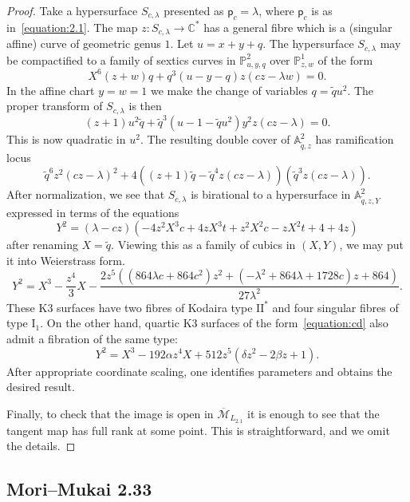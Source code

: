\documentclass[10pt]{amsart}
\numberwithin{equation}{section}
\theoremstyle{plain}
\theoremstyle{definition}
\theoremstyle{remark}
\begin{document}
\begin{proof}
  Take a hypersurface \(S_{c,\lambda}\) presented as \(\mathsf{p}_c = \lambda\), where \(\mathsf{p}_c\) is as in~\eqref{equation:2.1}. The map \(z \colon S_{c,\lambda}\rightarrow \mathbb{C}^*\) has a general fibre which is a (singular affine) curve of geometric genus \(1\). Let \(u= x+y+q\). The hypersurface \(S_{c,\lambda}\) may be compactified to a family of sextics curves in \(\mathbb{P}^2_{u,y,q}\) over \(\mathbb{P}^1_{z,w}\) of the form
  \[
    X^6(z+ w)q + q^3(u-y-q)z(cz-\lambda w) = 0.
  \]
  In the affine chart \(y=w=1\) we make the change of variables \(q=\widetilde{q}u^2\). The proper transform of \(S_{c,\lambda}\) is then
  \[
    (z+ 1)u^2\widetilde{q} + \widetilde{q}^3(u-1-\widetilde{q}u^2)y^2z(cz-\lambda) = 0.
  \]
  This is now quadratic in \(u^2\). The resulting double cover of \(\mathbb{A}^2_{\widetilde{q},z}\)  has ramification locus
  \[
    \widetilde{q}^6z^2(cz-\lambda)^2 + 4((z+ 1)\widetilde{q} - \widetilde{q}^4z(cz-\lambda))(\widetilde{q}^3z(cz-\lambda)).
  \]
  After normalization, we see that \(S_{c,\lambda}\) is birational to a hypersurface in \(\mathbb{A}^2_{\widetilde{q},z,Y}\) expressed in terms of the equations
  \[
    Y^2 = (\lambda-cz)(-4z^2X^3c + 4zX^3t + z^2X^2c - zX^2t + 4 + 4z)
  \]
  after renaming \(X = \widetilde{q}\). Viewing this as a family of cubics in \((X,Y)\), we may put it into Weierstrass form.
  \[
    Y^2 = X^3 - \dfrac{z^4}{3}X - \dfrac{2 z^5 ((864\lambda c + 864c^2)z^2 + (-\lambda^2 + 864\lambda + 1728c)z + 864)}{27\lambda^2}.
  \]
  These K3 surfaces have two fibres of Kodaira type \(\mathrm{II}^*\) and four singular fibres of type \(\mathrm{I}_1\). On the other hand, quartic K3 surfaces of the form~\eqref{equation:cd} also admit a fibration of the same type:
  \[
    Y^2 = X^3 -192\alpha z^4X + 512z^5 (\delta z^2 -2\beta z + 1).
  \]
  After appropriate coordinate scaling, one identifies parameters and obtains the desired result.

  Finally, to check that the image is open in \(\overline{\mathcal{M}}_{L_{2.1}}\) it is enough to see that the tangent map has full rank at some point. This is straightforward, and we omit the details.
\end{proof}

\subsection{Mori--Mukai 2.33}
\end{document}
